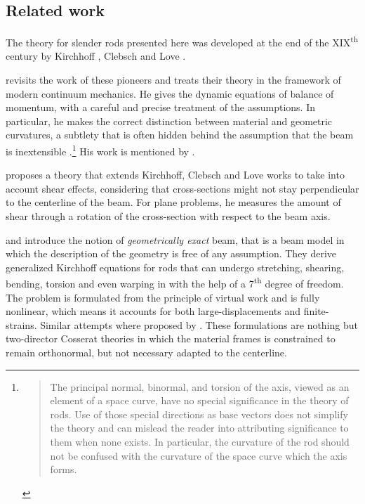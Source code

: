 \subsection{Related work}

The theory for slender rods presented here was developed at the end of the XIX\textsuperscript{th} century by Kirchhoff \cite{Kirchhoff1850,Kirchhoff1876}, Clebsch \cite{Clebsch1883} and Love \cite{Love1906}.

 revisits the work of these pioneers and treats their theory in the framework of modern continuum mechanics. He gives the dynamic equations of balance of momentum, with a careful and precise treatment of the assumptions. In particular, he makes the correct distinction between material and geometric curvatures, a subtlety that is often hidden behind the assumption that the beam is inextensible \cite{Adriaenssens1999,Douthe2007,DAmico2014}.\footnote{\blockcquote[p.~5]{Dill1992}{The principal normal, binormal, and torsion of the axis, viewed as an element of a space curve, have no special significance in the theory of rods. Use of those special directions as base vectors does not simplify the theory and can mislead the reader into attributing significance to them when none exists. In particular, the curvature of the rod should not be confused with the curvature of the space curve which the axis forms.}} His work is mentioned by . 


 proposes a theory that extends Kirchhoff, Clebsch and Love works to take into account shear effects, considering that cross-sections might not stay perpendicular to the centerline of the beam. For plane problems, he measures the amount of shear through a rotation of the cross-section with respect to the beam axis.

 and  introduce the notion of \emph{geometrically exact} beam, that is a beam model in which the description of the geometry is free of any assumption. They derive generalized Kirchhoff equations for rods that can undergo stretching, shearing, bending, torsion and even warping in \cite{Simo1991} with the help of a 7\textsuperscript{th} degree of freedom. The problem is formulated from the principle of virtual work and is fully nonlinear, which means it accounts for both large-displacements and finite-strains. Similar attempts where proposed by \cite{Antman1974}. These formulations are nothing but two-director Cosserat theories in which the material frames is constrained to remain orthonormal, but not necessary adapted to the centerline.
 
